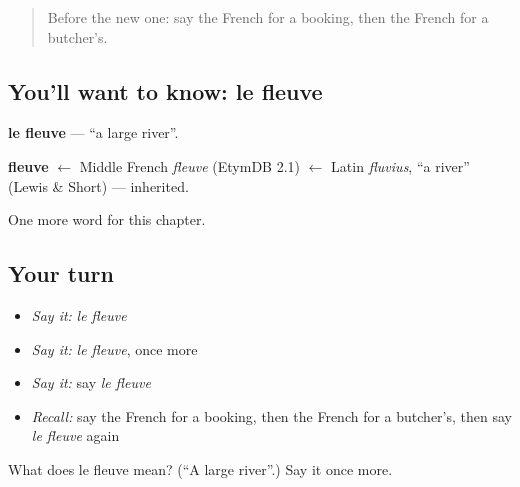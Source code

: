 \begin{quote}
Before the new one: say the French for a booking, then the French for a butcher's.
\end{quote}

\subsection*{You'll want to know: le fleuve}
\textbf{le fleuve} — \textquotedblleft{}a large river\textquotedblright{}.

\begin{cousinweb}
\textbf{fleuve} $\leftarrow$ Middle French \emph{fleuve} (EtymDB 2.1) $\leftarrow$ Latin \emph{fluvius}, \textquotedblleft{}a river\textquotedblright{} (Lewis \& Short) — inherited.
\end{cousinweb}

\begin{grammarlens}[title={What you've built}]
One more word for this chapter.
\end{grammarlens}

\subsection*{Your turn}
\begin{itemize}
\raggedright
  \item \emph{Say it:} \emph{le fleuve}
  \item \emph{Say it:} \emph{le fleuve}, once more
  \item \emph{Say it:} say \emph{le fleuve}
  \item \emph{Recall:} say the French for a booking, then the French for a butcher's, then say \emph{le fleuve} again
\end{itemize}

\begin{tcolorbox}[breakable,colback=teal!4,colframe=teal!35!black,title={Before you move on}]
What does le fleuve mean? (\textquotedblleft{}A large river\textquotedblright{}.) Say it once more.
\end{tcolorbox}
